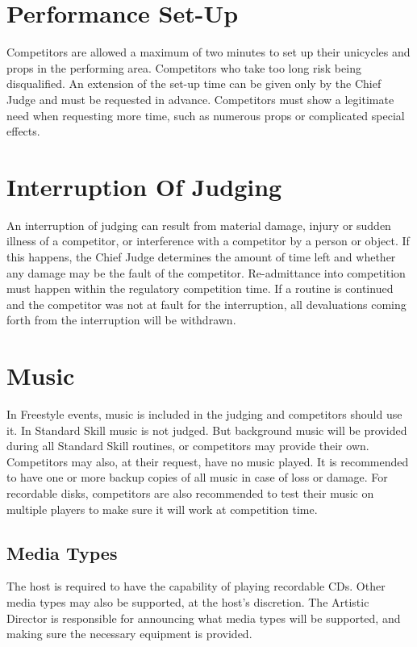\section{Performance Set-Up}
Competitors are allowed a maximum of two minutes to set up their unicycles and props in the performing area.
Competitors who take too long risk being disqualified.
An extension of the set-up time can be given only by the Chief Judge and must be requested in advance.
Competitors must show a legitimate need when requesting more time, such as numerous props or complicated special effects.

\section{Interruption Of Judging}
An interruption of judging can result from material damage, injury or sudden illness of a competitor, or interference with a competitor by a person or object.
If this happens, the Chief Judge determines the amount of time left and whether any damage may be the fault of the competitor.
Re-admittance into competition must happen within the regulatory competition time.
If a routine is continued and the competitor was not at fault for the interruption, all devaluations coming forth from the interruption will be withdrawn.

\section{Music \label{sec:freestyle_music}}
In Freestyle events, music is included in the judging and competitors should use it.
In Standard Skill music is not judged.
But background music will be provided during all Standard Skill routines, or competitors may provide their own.
Competitors may also, at their request, have no music played.
It is recommended to have one or more backup copies of all music in case of loss or damage.
For recordable disks, competitors are also recommended to test their music on multiple players to make sure it will work at competition time.

\subsection{Media Types}
The host is required to have the capability of playing recordable CDs.
Other media types may also be supported, at the host's discretion.
The Artistic Director is responsible for announcing what media types will be supported, and making sure the necessary equipment is provided.


